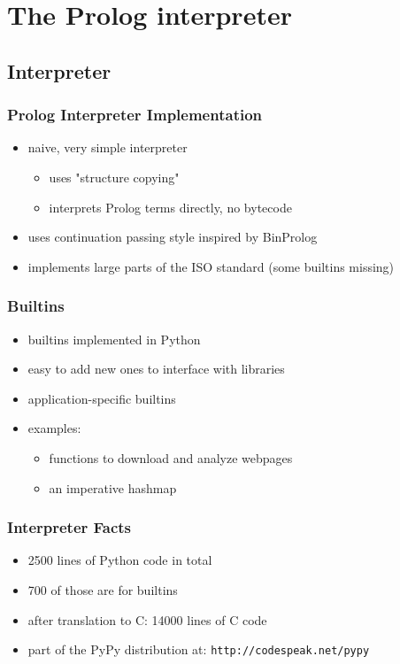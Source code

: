 \documentclass[utf8]{beamer}
\begin{document}
\section{The Prolog interpreter}
\subsection{Interpreter}
\begin{frame}
  \frametitle{Prolog Interpreter Implementation}
  \begin{itemize}
  \item
    naive, very simple interpreter
    \begin{itemize}
    \item uses "structure copying"
    \item interprets Prolog terms directly, no bytecode
    \end{itemize}
  \item
    uses continuation passing style inspired by BinProlog
  \item
    implements large parts of the ISO standard (some builtins missing)
  \end{itemize}
\end{frame}


\begin{frame}
  \frametitle{Builtins}
  \begin{itemize}
  \item
    builtins implemented in Python
  \item
    easy to add new ones to interface with libraries
  \item
    application-specific builtins
  \item
    examples:
    \begin{itemize}
    \item functions to download and analyze webpages
    \item an imperative hashmap
    \end{itemize}
  \end{itemize}
\end{frame}


\begin{frame}
  \frametitle{Interpreter Facts}
  \begin{itemize}
  \item
    2500 lines of Python code in total
  \item
    700 of those are for builtins
  \item
    after translation to C: 14000 lines of C code
  \item
    part of the PyPy distribution at:
    \texttt{http://codespeak.net/pypy}
  \end{itemize}
\end{frame}
\end{document}
